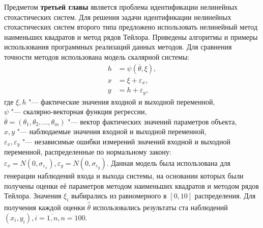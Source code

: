 Предметом \textbf{третьей главы} является проблема идентификации нелинейных стохастических систем.
Для решения задачи идентификации нелинейных стохастических систем второго типа
предложено использовать нелинейный метод наименьших квадратов и метод рядов Тейлора.
Приведены алгоритмы и примеры использования программных реализаций данных методов.
Для сравнения точности методов использована модель скалярной системы:
\begin{equation*}
  \begin{aligned}
    h &= \psi(\overline{\theta}, \xi), \\
    x &= \xi + \varepsilon_x, \\
    y &= h + \varepsilon_y,
  \end{aligned}
\end{equation*}
где \( \xi, h \) "--- фактические значения входной и выходной переменной, \\
\hspace*{7mm} \( \psi \) "--- скалярно-векторная функция регрессии, \\
\hspace*{7mm} \( \overline{\theta} = (\theta_1, \theta_2, \dotsc, \theta_m) \)
"--- вектор фактических значений параметров объекта, \\
\hspace*{7mm} \( x, y \) "--- наблюдаемые значения входной и выходной переменной, \\
\hspace*{6mm} \( \varepsilon_x, \varepsilon_y \)
"--- независимые ошибки измерений значений входной и выходной переменной,
распределенные по нормальному закону:
\(
\varepsilon_x = N(0, \sigma_{\varepsilon_x}),
\varepsilon_y = N(0, \sigma_{\varepsilon_y})
\).
Данная модель была использована для генерации наблюдений входа и выхода системы,
на основании которых были получены оценки её параметров
методом наименьших квадратов и методом рядов Тейлора.
Значения \( \xi_i \) выбирались из равномерного в \( [0, 10] \) распределения.
Для получения каждой оценки \( \hat{\overline{\theta}} \) использовались результаты
ста наблюдений \( ( x_i, y_i ), i = \overline{1, n}, n = 100 \).

